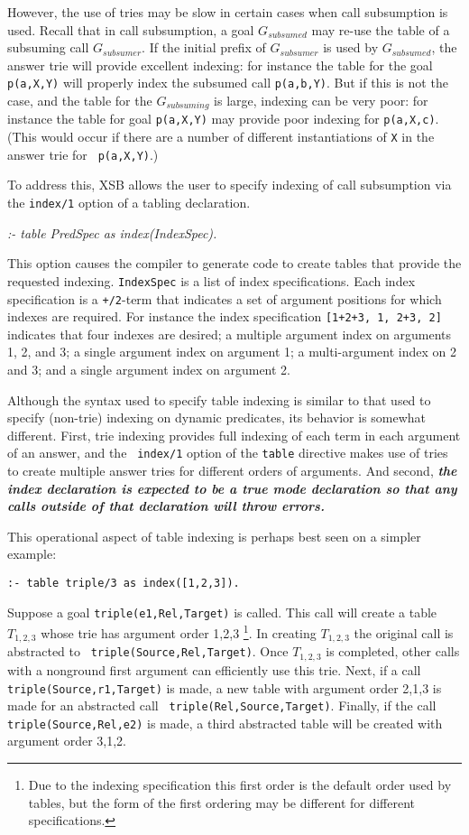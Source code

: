 \begin{description}
\begin{description}
However, the use of tries may be slow in certain cases when call
subsumption is used.  Recall that in call subsumption, a goal
$G_{subsumed}$ may re-use the table of a subsuming call
$G_{subsumer}$.  If the initial prefix of $G_{subsumer}$ is used by
$G_{subsumed}$, the answer trie will provide excellent indexing: for
instance the table for the goal {\tt p(a,X,Y)} will properly index the
subsumed call {\tt p(a,b,Y)}.  But if this is not the case, and the
table for the $G_{subsuming}$ is large, indexing can be very poor: for
instance the table for goal {\tt p(a,X,Y)} may provide poor indexing
for {\tt p(a,X,c)}.  (This would occur if there are a number of
  different instantiations of {\tt X} in the answer trie for {\tt
    p(a,X,Y)}.)

To address this, XSB allows the user to specify indexing of call
subsumption via the {\tt index/1} option of a tabling declaration.

{\em :- table PredSpec as index(IndexSpec).}

This option causes the compiler to generate code to create tables that
provide the requested indexing.  {\tt IndexSpec} is a list of index
specifications.  Each index specification is a {\tt +/2}-term that
indicates a set of argument positions for which indexes are required.
For instance the index specification {\tt [1+2+3, 1, 2+3, 2]}
indicates that four indexes are desired; a multiple argument index on
arguments 1, 2, and 3; a single argument index on argument 1; a
multi-argument index on 2 and 3; and a single argument index on
argument 2.

Although the syntax used to specify table indexing is similar to that
used to specify (non-trie) indexing on dynamic predicates, its
behavior is somewhat different.  First, trie indexing provides full
indexing of each term in each argument of an answer, and the {\tt
  index/1} option of the {\tt table} directive makes use of tries to
create multiple answer tries for different orders of arguments.  And
second, {\bf {\em  the index declaration is expected to be a true mode
declaration so that any calls outside of that declaration will throw
errors.}}

This operational aspect of table indexing is perhaps best seen on a
simpler example:

{\tt :- table triple/3 as index([1,2,3]).}

Suppose a goal {\tt triple(e1,Rel,Target)} is called.  This call will
create a table $T_{1,2,3}$ whose trie has argument order
1,2,3 \footnote{Due to the indexing specification this first order is
  the default order used by tables, but the form of the first ordering
  may be different for different specifications.}.  In creating
$T_{1,2,3}$ the original call is abstracted to {\tt
  triple(Source,Rel,Target)}.  Once $T_{1,2,3}$ is completed, other
calls with a nonground first argument can efficiently use this trie.
Next, if a call {\tt triple(Source,r1,Target)} is made, a new table
with argument order 2,1,3 is made for an abstracted call {\tt
  triple(Rel,Source,Target)}.  Finally, if the call {\tt
  triple(Source,Rel,e2)} is made, a third abstracted table will be
created with argument order 3,1,2.


\end{description}
\end{description}
